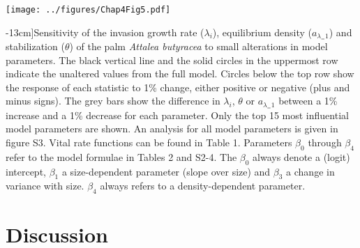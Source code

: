 \documentclass[b5paper,justified]{tufte-book} %
\begin{document}
\begin{fullwidth}
\begin{landscape}
\begin{figure*}
\hspace*{2.75cm} \texttt{[image: ../figures/Chap4Fig5.pdf]}
\caption[Sensitivity of the invasion growth rate, equilibrium density and stabilization][-13cm]{Sensitivity of the invasion growth rate ($\lambda_i$), equilibrium density ($a_{\lambda_=1}$) and stabilization ($\theta$) of the palm \textit{Attalea butyracea} to small alterations in model parameters. The black vertical line and the solid circles in the uppermost row indicate the unaltered values from the full model.  Circles below the top row show the response of each statistic to 1\% change, either positive or negative (plus and minus signs).   The grey bars show the difference in $\lambda_i$, $\theta$ or $a_{\lambda_=1}$ between a 1\% increase and a 1\% decrease for each parameter. Only the top 15 most influential model parameters are shown. An analysis for all model parameters is given in figure S3. Vital rate functions can be found in Table 1. Parameters $\beta_0$ through $\beta_4$  refer to the model formulae in Tables 2 and S2-4. The $\beta_0$ always denote a (logit) intercept, $\beta_1$ a size-dependent parameter (slope over size) and $\beta_3$  a change in variance with size. $\beta_4$ always refers to a density-dependent parameter.}
\label{fig:chap4fig5}
\end{figure*}
\end{landscape}

\section{Discussion}


\end{fullwidth}
\end{document}
